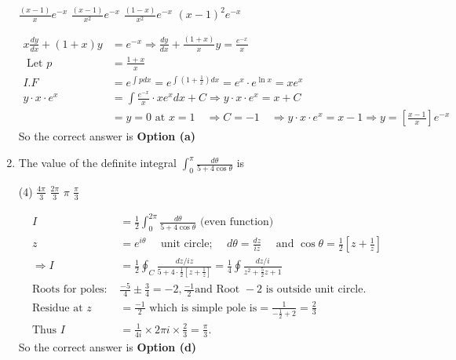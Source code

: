 \begin{enumerate}
\begin{tasks}
	\task[\textbf{a.}]$\frac{(x-1)}{x} e^{-x}$
	\task[\textbf{b.}] $\frac{(x-1)}{x^{2}} e^{-x}$
	\task[\textbf{c.}] $\frac{(1-x)}{x^{2}} e^{-x}$
	\task[\textbf{d.}] $(x-1)^{2} e^{-x}$
\end{tasks}
\begin{answer}
	\begin{align*}
	x \frac{d y}{d x}+(1+x) y&=e^{-x} \Rightarrow \frac{d y}{d x}+\frac{(1+x)}{x} y=\frac{e^{-x}}{x}\\
\text{	Let }p&=\frac{1+x}{x}\\
	I . F&=e^{\int p d x}=e^{\int\left(1+\frac{1}{x}\right) d x}=e^{x} \cdot e^{\ln x}=x e^{x} \\
	y \cdot x \cdot e^{x}&=\int \frac{e^{-x}}{x} \cdot x e^{x} d x+C \Rightarrow y \cdot x \cdot e^{x}=x+C \\
	&=y=0 \text { at } x=1 \quad \Rightarrow C=-1 \quad \Rightarrow y \cdot x \cdot e^{x}=x-1 \Rightarrow y=\left[\frac{x-1}{x}\right] e^{-x}
	\end{align*}
		So the correct answer is \textbf{Option (a)}
\end{answer}
\item The value of the definite integral $\int_{0}^{\pi} \frac{d \theta}{5+4 \cos \theta}$ is
 \begin{tasks}(4)
	\task[\textbf{a.}]$\frac{4 \pi}{3}$
	\task[\textbf{b.}] $\frac{2 \pi}{3}$
	\task[\textbf{c.}]$\pi$
	\task[\textbf{d.}]$\frac{\pi}{3}$ 
\end{tasks}
\begin{answer}
	\begin{align*}
	I&=\frac{1}{2} \int_{0}^{2 \pi} \frac{d \theta}{5+4 \cos \theta}
\text{	(even function)}\\
z&=e^{i \theta} \quad \text { unit circle; } \quad d \theta=\frac{d z}{i z} \quad \text { and } \cos \theta=\frac{1}{2}\left[z+\frac{1}{z}\right]\\
\Rightarrow I&=\frac{1}{2} \oint_{C} \frac{d z / i z}{5+4 \cdot \frac{1}{2}\left[z+\frac{1}{z}\right]}=\frac{1}{4} \oint \frac{d z / i}{z^{2}+\frac{5}{2} z+1}\\
\text{Roots for poles: }&\frac{-5}{4} \pm \frac{3}{4}=-2, \frac{-1}{2}
\text{and Root }-2\text{ is outside unit circle.}\\
\text{Residue at }z&=\frac{-1}{2}\text{ which is simple pole is} =\frac{1}{-\frac{1}{2}+2}=\frac{2}{3}\\
\text{Thus }I&=\frac{1}{4 i} \times 2 \pi i \times \frac{2}{3}=\frac{\pi}{3}.
	\end{align*}
		So the correct answer is \textbf{Option (d)}

\end{answer}
\end{enumerate}
